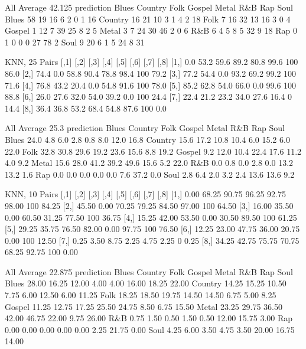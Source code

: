 \documentclass[a4paper,oneside]{article}
\begin{document}
All
Average 42.125
prediction Blues Country Folk Gospel Metal R\&B Rap Soul
   Blues      58      19   16      6     2   0   1   16
   Country    16      21   10      3     1   4   2   18
   Folk        7      16   32     13    16   3   0    4
   Gospel      1      12    7     39    25   8   2    5
   Metal       3       7   24     30    46   2   0    6
   R\&B         6       4    5      8     5  32   9   18
   Rap         0       1    0      0     0  27  78    2
   Soul        9      20    6      1     5  24   8   31

KNN, 25
Pairs
     [,1] [,2] [,3] [,4] [,5] [,6] [,7] [,8]
[1,]  0.0 53.2 59.6 89.2 80.8 99.6  100 86.0
[2,] 74.4  0.0 58.8 90.4 78.8 98.4  100 79.2
[3,] 77.2 54.4  0.0 93.2 69.2 99.2  100 71.6
[4,] 76.8 43.2 20.4  0.0 54.8 91.6  100 78.0
[5,] 85.2 62.8 54.0 66.0  0.0 99.6  100 88.8
[6,] 26.0 27.6 32.0 54.0 39.2  0.0  100 24.4
[7,] 22.4 21.2 23.2 34.0 27.6 16.4    0 14.4
[8,] 36.4 36.8 53.2 68.4 54.8 87.6  100  0.0

All
Average 25.3
prediction Blues Country Folk Gospel Metal  R\&B  Rap Soul
   Blues    24.0     4.8  6.0    2.8   0.8  8.0 12.0 16.8
   Country  15.6    17.2 10.8   10.4   6.0 15.2  6.0 22.0
   Folk     32.8    30.8 29.6   19.2  23.6 15.6  8.8 19.2
   Gospel    9.2    12.0 10.4   22.4  17.6 11.2  4.0  9.2
   Metal    15.6    28.0 41.2   39.2  49.6 15.6  5.2 22.0
   R\&B       0.0     0.8  0.0    2.8   0.0 13.2 13.2  1.6
   Rap       0.0     0.0  0.0    0.0   0.0  7.6 37.2  0.0
   Soul      2.8     6.4  2.0    3.2   2.4 13.6 13.6  9.2

KNN, 10
Pairs
      [,1]  [,2]  [,3]  [,4]  [,5]  [,6] [,7]  [,8]
[1,]  0.00 68.25 90.75 96.25 92.75 98.00  100 84.25
[2,] 45.50  0.00 70.25 79.25 84.50 97.00  100 64.50
[3,] 16.00 35.50  0.00 60.50 31.25 77.50  100 36.75
[4,] 15.25 42.00 53.50  0.00 30.50 89.50  100 61.25
[5,] 29.25 35.75 76.50 82.00  0.00 97.75  100 76.50
[6,] 12.25 23.00 47.75 36.00 20.75  0.00  100 12.50
[7,]  0.25  3.50  8.75  2.25  4.75  2.25    0  0.25
[8,] 34.25 42.75 75.75 70.75 68.25 92.75  100  0.00

All
Average 22.875
prediction Blues Country  Folk Gospel Metal   R\&B   Rap  Soul
   Blues   28.00   16.25 12.00   4.00  4.00 16.00 18.25 22.00
   Country 14.25   15.25 10.50   7.75  6.00 12.50  6.00 11.25
   Folk    18.25   18.50 19.75  14.50 14.50  6.75  5.00  8.25
   Gospel  11.25   12.75 17.25  25.50 24.75  8.50  6.75 15.50
   Metal   23.25   29.75 36.50  42.00 46.75 22.00  9.75 26.00
   R\&B      0.75    1.50  0.50   1.50  0.50 12.00 15.75  3.00
   Rap      0.00    0.00  0.00   0.00  0.00  2.25 21.75  0.00
   Soul     4.25    6.00  3.50   4.75  3.50 20.00 16.75 14.00
\end{document}
